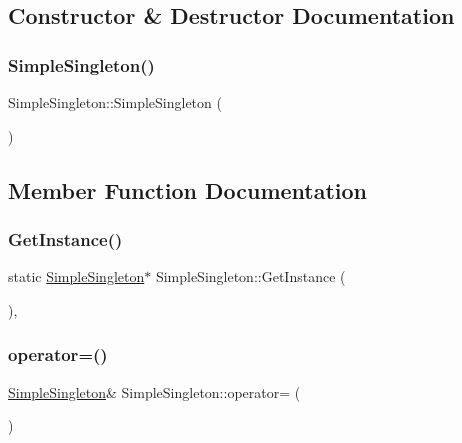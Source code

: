 \subsection{Constructor \& Destructor Documentation}
\mbox{\label{class_simple_singleton_aeb57c1d8ea17414c1d33ca5e80d1d91d}} 
\subsubsection{\texorpdfstring{SimpleSingleton()}{SimpleSingleton()}}
{\footnotesize\ttfamily Simple\+Singleton\+::\+Simple\+Singleton (\begin{DoxyParamCaption}\item[{\mbox{\hyperlink{class_simple_singleton}{Simple\+Singleton}} const \&}]{ }\end{DoxyParamCaption})\hspace{0.3cm}{\ttfamily [delete]}}



\subsection{Member Function Documentation}
\mbox{\label{class_simple_singleton_af967f13cf4b29765becf0ef7cfb703ad}} 
\subsubsection{\texorpdfstring{GetInstance()}{GetInstance()}}
{\footnotesize\ttfamily static \mbox{\hyperlink{class_simple_singleton}{Simple\+Singleton}}$\ast$ Simple\+Singleton\+::\+Get\+Instance (\begin{DoxyParamCaption}{ }\end{DoxyParamCaption})\hspace{0.3cm}{\ttfamily [inline]}, {\ttfamily [static]}}

\mbox{\label{class_simple_singleton_a5484acd9fdcd902b242ee5e557d6d265}} 
\subsubsection{\texorpdfstring{operator=()}{operator=()}}
{\footnotesize\ttfamily \mbox{\hyperlink{class_simple_singleton}{Simple\+Singleton}}\& Simple\+Singleton\+::operator= (\begin{DoxyParamCaption}\item[{\mbox{\hyperlink{class_simple_singleton}{Simple\+Singleton}} const \&}]{ }\end{DoxyParamCaption})\hspace{0.3cm}{\ttfamily [delete]}}

